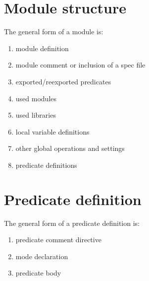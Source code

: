 \section{Module structure}
The general form of a module is:

\begin{enumerate}
\item  module definition
\item  module comment or inclusion of a spec file
\item  exported/reexported predicates
\item  used modules
\item  used libraries
\item  local variable definitions 
\item  other global operations and settings
\item  predicate definitions
\end{enumerate}

\section{Predicate definition}
The general form of a predicate definition is:

\begin{enumerate}
\item  predicate comment directive
\item  mode declaration
\item  predicate body
\end{enumerate}

